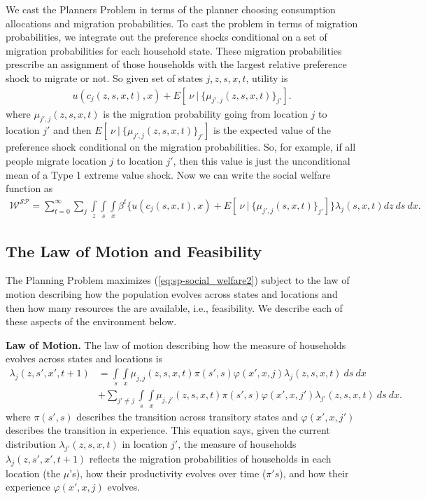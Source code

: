 \documentclass[12pt,pdftex]{article}
\begin{document}
\begin{onehalfspacing}
We cast the Planners Problem in terms of the planner choosing consumption allocations and migration probabilities. To cast the problem in terms of migration probabilities, we integrate out the preference shocks conditional on a set of migration probabilities for each household state. These migration probabilities prescribe an assignment of those households with the largest relative preference shock to migrate or not. So given set of states $j, z, s, x, t$, utility is
\begin{align}
u(c_{j}(z,s, x, t), x) + E[ \ \nu \ | \ \big\{\mu_{j',j}(z,s,x,t)\big\}_{j'} ].
\label{eq:utility-shocks}
\end{align}
where $\mu_{j',j}(z,s,x,t)$ is the migration probability going from location $j$ to location $j'$ and then $E[ \ \nu \ | \ \big\{\mu_{j',j}(z,s,x,t)\big\}_{j'} ]$ is the expected value of the preference shock conditional on the migration probabilities. So, for example, if all people migrate location $j$ to location $j'$, then this value is just the unconditional mean of a Type 1 extreme value shock. Now we can write the social welfare function as
\begin{align}
\mathcal{W^{SP}} = \sum_{t=0}^{\infty}\sum_{j} \int\limits_{z} \int\limits_{s} \int\limits_{x} \beta^{t} \bigg \{ u(c_{j}(s, x, t), x) + E[ \ \nu \ | \ \big\{\mu_{j',j}(s,x,t)\big\}_{j'}] \bigg \} \lambda_{j}(s, x, t) dz \ ds \ dx.
\label{eq:sp-social_welfare2}
\end{align}

\subsection{The Law of Motion and Feasibility}

The Planning Problem maximizes (\ref{eq:sp-social_welfare2}) subject to the law of motion describing how the population evolves across states and locations and then how many resources the are available, i.e., feasibility. We describe each of these aspects of the environment below.

\textbf{Law of Motion.} The law of motion describing how the measure of households evolves across states and locations is
\begin{align}
\lambda_{j}(z, s', x', t+1)  & =  \int\limits_{s} \int\limits_{x}  \mu_{j,j}(z, s,x,t)\pi(s',s) \varphi(x',x, j) \lambda_{j}(z, s, x, t)  \ ds \ dx  \  \label{eq:planner_law_motion} \\
& +  \sum_{j' \neq j} \int\limits_{s} \int\limits_{x} \mu_{j,j'}(z, s,x,t) \pi(s',s) \varphi(x',x, j') \lambda_{j'}(z, s, x, t)  \ ds  \ dx. \nonumber
\end{align}
where $\pi(s',s)$ describes the transition across transitory states and $\varphi(x',x, j')$ describes the transition in experience. This equation says, given the current distribution $\lambda_{j'}(z, s, x, t)$ in location $j'$, the measure of households $\lambda_{j}(z, s', x', t+1)$ reflects the migration probabilities of households in each location (the $\mu$'s), how their productivity evolves over time ($\pi's$), and how their experience $\varphi(x',x, j)$ evolves.


\end{onehalfspacing}
\end{document}
